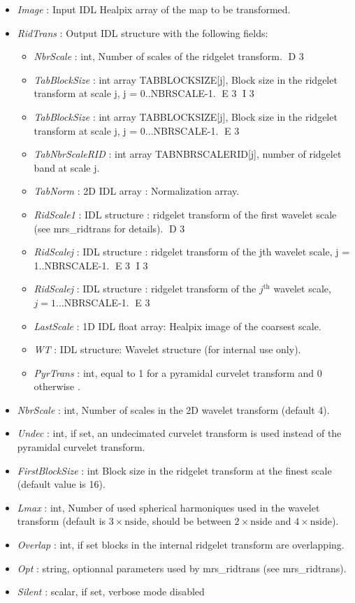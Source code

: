 \begin{itemize}
\item {\em Image} : Input IDL Healpix array of the map to be transformed.
\item {\em RidTrans} : Output IDL structure with the following fields: 
\begin{itemize} 
\item {\em NbrScale} : int, Number of scales of the ridgelet transform.
D 3
\item {\em TabBlockSize} : int array TABBLOCKSIZE[j], Block size in the ridgelet transform at scale j, j = 0..NBRSCALE-1.
E 3
I 3
\item {\em TabBlockSize} : int array TABBLOCKSIZE[j], Block size in the ridgelet transform at scale j, j = 0...NBRSCALE-1.
E 3
\item {\em TabNbrScaleRID} : int array TABNBRSCALERID[j], number of ridgelet band at scale j.
\item {\em TabNorm} : 2D IDL array : Normalization array.
\item {\em RidScale1} : IDL structure : ridgelet transform of the first wavelet scale (see mrs\_ridtrans for details).
D 3
\item {\em RidScalej} : IDL structure : ridgelet transform of the jth wavelet scale, j = 1..NBRSCALE-1.
E 3
I 3
\item {\em RidScalej} : IDL structure : ridgelet transform of the $j^{\textrm{th}}$ wavelet scale,\\ $j=1\ldots$NBRSCALE-1.
E 3
\item {\em LastScale} : 1D IDL float array: Healpix image of the coarsest scale.
\item {\em WT} : IDL structure: Wavelet structure (for internal use only).
\item {\em PyrTrans} : int, equal to 1 for a pyramidal curvelet transform and 0 otherwise .
\end{itemize}
\item {\em NbrScale} : int, Number of scales in the 2D wavelet transform (default 4).
\item {\em Undec} : int, if set, an undecimated curvelet transform is used instead of the pyramidal curvelet transform.
\item {\em FirstBlockSize} : int Block size in the ridgelet transform at the finest scale (default value is 16).
\item {\em Lmax} : int, Number of used spherical harmoniques used in the wavelet transform 
(default is $3\times \textrm{nside}$, should be between $2\times \textrm{nside}$ and $4\times \textrm{nside}$).
\item {\em Overlap} : int, if set blocks in the internal ridgelet transform are overlapping.
\item {\em Opt} : string, optionnal parameters used by mrs\_ridtrans (see mrs\_ridtrans).
\item {\em Silent} : scalar, if set, verbose mode disabled
\end{itemize}

